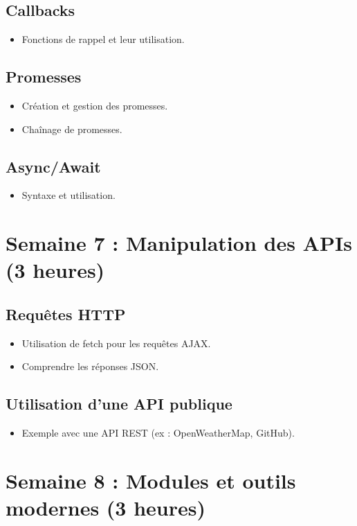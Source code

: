 \documentclass[12pt]{article}
\begin{document}
\subsection*{Callbacks }
\begin{itemize}
    \item Fonctions de rappel et leur utilisation.
\end{itemize}

\subsection*{Promesses}
\begin{itemize}
    \item Création et gestion des promesses.
    \item Chaînage de promesses.
\end{itemize}

\subsection*{Async/Await }
\begin{itemize}
    \item Syntaxe et utilisation.
\end{itemize}

\section*{Semaine 7 : Manipulation des APIs (3 heures)}
\subsection*{Requêtes HTTP }
\begin{itemize}
    \item Utilisation de fetch pour les requêtes AJAX.
    \item Comprendre les réponses JSON.
\end{itemize}

\subsection*{Utilisation d'une API publique }
\begin{itemize}
    \item Exemple avec une API REST (ex : OpenWeatherMap, GitHub).
\end{itemize}

\section*{Semaine 8 : Modules et outils modernes (3 heures)}
\end{document}
